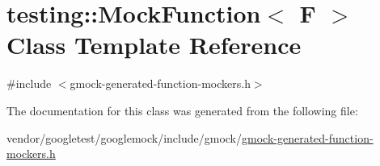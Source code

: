 \hypertarget{classtesting_1_1MockFunction}{}\section{testing\+:\+:Mock\+Function$<$ F $>$ Class Template Reference}
\label{classtesting_1_1MockFunction}


{\ttfamily \#include $<$gmock-\/generated-\/function-\/mockers.\+h$>$}



The documentation for this class was generated from the following file\+:\begin{DoxyCompactItemize}
\item 
vendor/googletest/googlemock/include/gmock/\hyperlink{gmock-generated-function-mockers_8h}{gmock-\/generated-\/function-\/mockers.\+h}\end{DoxyCompactItemize}
